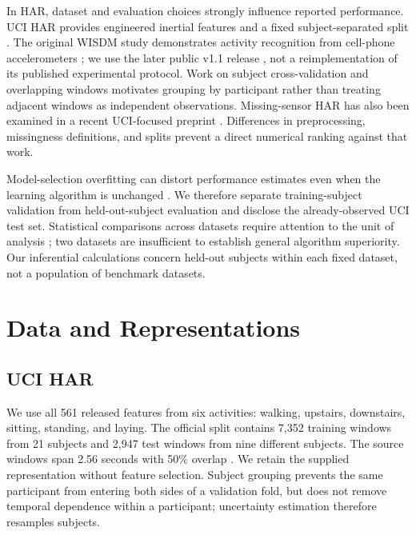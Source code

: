 \documentclass[conference]{IEEEtran}
\begin{document}
In HAR, dataset and evaluation choices strongly influence reported performance. UCI HAR provides engineered inertial features and a fixed subject-separated split \cite{anguita2013har}. The original WISDM study demonstrates activity recognition from cell-phone accelerometers \cite{kwapisz2010}; we use the later public v1.1 release \cite{wisdm2012}, not a reimplementation of its published experimental protocol. Work on subject cross-validation \cite{dehghani2019validation} and overlapping windows \cite{dehghani2019windows} motivates grouping by participant rather than treating adjacent windows as independent observations. Missing-sensor HAR has also been examined in a recent UCI-focused preprint \cite{saha2025missing}. Differences in preprocessing, missingness definitions, and splits prevent a direct numerical ranking against that work.

Model-selection overfitting can distort performance estimates even when the learning algorithm is unchanged \cite{cawley2010}. We therefore separate training-subject validation from held-out-subject evaluation and disclose the already-observed UCI test set. Statistical comparisons across datasets require attention to the unit of analysis \cite{demsar2006}; two datasets are insufficient to establish general algorithm superiority. Our inferential calculations concern held-out subjects within each fixed dataset, not a population of benchmark datasets.

\section{Data and Representations}
\subsection{UCI HAR}
We use all 561 released features from six activities: walking, upstairs, downstairs, sitting, standing, and laying. The official split contains 7,352 training windows from 21 subjects and 2,947 test windows from nine different subjects. The source windows span 2.56 seconds with 50\% overlap \cite{anguita2013har}. We retain the supplied representation without feature selection. Subject grouping prevents the same participant from entering both sides of a validation fold, but does not remove temporal dependence within a participant; uncertainty estimation therefore resamples subjects.
\end{document}
